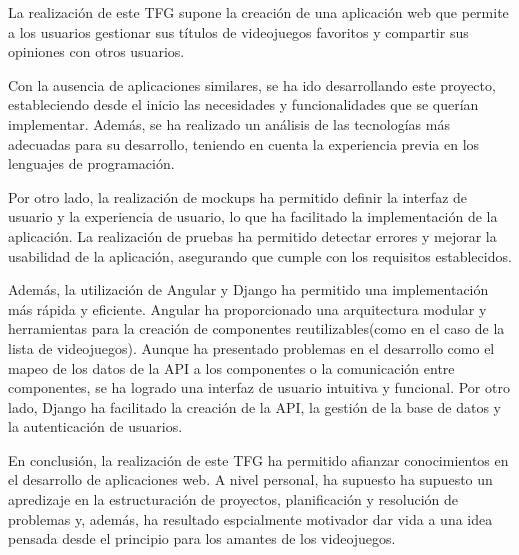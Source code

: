 La realización de este TFG supone la creación de una aplicación web que permite a los usuarios gestionar sus títulos de videojuegos 
favoritos y compartir sus opiniones con otros usuarios. 

Con la ausencia de aplicaciones similares, se ha ido desarrollando este proyecto, estableciendo desde el inicio 
las necesidades y funcionalidades que se querían implementar. Además, se ha realizado un análisis de las 
tecnologías más adecuadas para su desarrollo, teniendo en cuenta la 
experiencia previa en los lenguajes de programación. 

Por otro lado, la realización de mockups ha permitido definir la interfaz de usuario y la experiencia de usuario,
lo que ha facilitado la implementación de la aplicación. La realización de pruebas ha permitido detectar errores y 
mejorar la usabilidad de la aplicación, asegurando que cumple con los requisitos establecidos.

Además, la utilización de Angular y Django ha permitido una implementación más rápida y eficiente. Angular ha proporcionado 
una arquitectura modular y herramientas para la creación de componentes reutilizables(como en el caso de la lista 
de videojuegos). Aunque ha presentado problemas en el desarrollo como el mapeo de los datos de la API a los 
componentes o la comunicación entre componentes, se ha logrado una interfaz de usuario intuitiva y funcional. 
Por otro lado, Django ha facilitado la creación de la API, la gestión de la base de datos y la autenticación de 
usuarios.


En conclusión, la realización de este TFG ha permitido afianzar conocimientos en el desarrollo de aplicaciones web. 
A nivel personal, ha supuesto ha supuesto un apredizaje en la estructuración de proyectos, planificación y 
resolución de problemas y, además, ha resultado espcialmente motivador dar vida 
a una idea pensada desde el principio para los amantes de los videojuegos. 